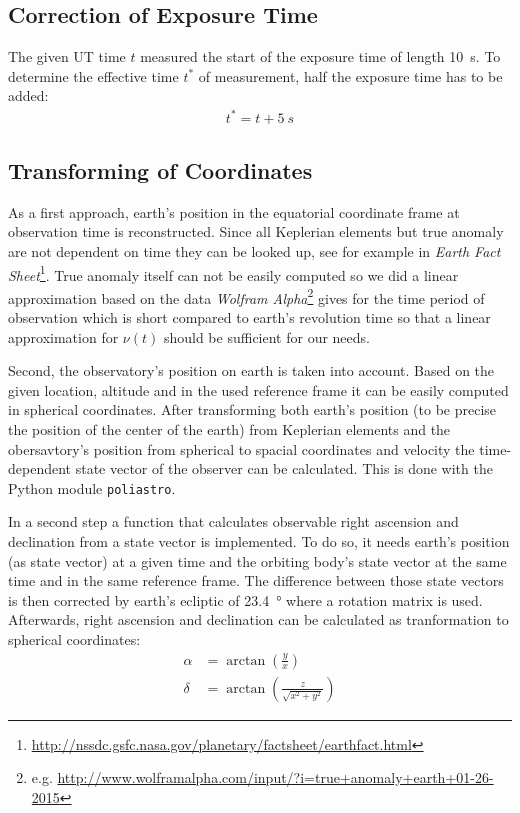\documentclass[11pt, a4paper]{article}
\numberwithin{equation}{section}
\begin{document}
\subsection{Correction of Exposure Time}
The given UT time $t$ measured the start of the exposure time of length \SI{10}{s}.
To determine the effective time $t^*$ of measurement, half the exposure time has to be added:
\begin{align}
	t^* = t + \SI{5}{s}
\end{align}

\subsection{Transforming of Coordinates}
\label{sec:cstransform}
As a first approach, earth's position in the equatorial coordinate frame at observation time is reconstructed.
Since all Keplerian elements but true anomaly are not dependent on time they can be looked up, see for example in \emph{Earth Fact Sheet}\footnote{\url{http://nssdc.gsfc.nasa.gov/planetary/factsheet/earthfact.html}}.
True anomaly itself can not be easily computed so we did a linear approximation based on the data \emph{Wolfram Alpha}\footnote{e.g. \url{http://www.wolframalpha.com/input/?i=true+anomaly+earth+01-26-2015}} gives for the time period of observation which is short compared to earth's revolution time so that a linear approximation for $\nu(t)$ should be sufficient for our needs.

Second, the observatory's position on earth is taken into account.
Based on the given location, altitude and in the used reference frame it can be easily computed in spherical coordinates.
After transforming both earth's position (to be precise the position of the center of the earth) from Keplerian elements and the obersavtory's position from spherical to spacial coordinates and velocity the time-dependent state vector of the observer can be calculated.
This is done with the Python module \texttt{poliastro}.

In a second step a function that calculates observable right ascension and declination from a state vector is implemented. 
To do so, it needs earth's position (as state vector) at a given time and the orbiting body's state vector at the same time and in the same reference frame.
The difference between those state vectors is then corrected by earth's ecliptic of \SI{23.4}{\degree} where a rotation matrix is used.
Afterwards, right ascension and declination can be calculated as tranformation to spherical coordinates:
\begin{align}
	\alpha &= \arctan\left(\frac{y}{x}\right) \\
	\delta &= \arctan\left(\frac{z}{\sqrt{x^2 + y^2}}\right)
\end{align}
\end{document}
